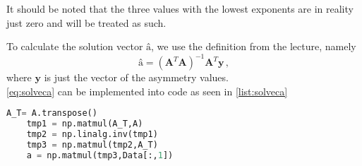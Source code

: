 It should be noted that the three values with the lowest exponents are in reality just zero and will be treated as such.

To calculate the solution vector $\textbf{â}$, we use the definition from the lecture, namely
\begin{equation}
    \textbf{â} = (\textbf{A}^T\textbf{A})^{-1}\textbf{A}^T \textbf{y} \,,
    \label{eq:solveca}
\end{equation}
where $\textbf{y}$ is just the vector of the asymmetry values. \\

\eqref{eq:solveca} can be implemented into code as seen in \autoref{list:solveca}


\begin{lstlisting}[language = Python, caption={Calculation of solution vector \textbf{â}.}, label = {list:solveca}]
    A_T= A.transpose()
    tmp1 = np.matmul(A_T,A)
    tmp2 = np.linalg.inv(tmp1)
    tmp3 = np.matmul(tmp2,A_T)
    a = np.matmul(tmp3,Data[:,1])
\end{lstlisting}


